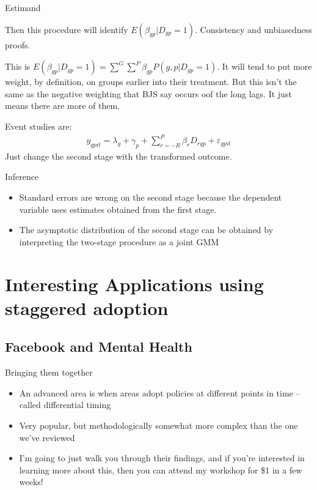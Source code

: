 \documentclass{beamer}
\begin{document}
\begin{frame}{Estimand}

Then this procedure will identify $E(\beta_{gp} | D_{gp}=1)$. Consistency and unbiasedness proofs. 

\bigskip

This is $E(\beta_{gp}|D_{gp}=1) = \sum^G \sum^P \beta_{gp} P(g,p|D_{gp}=1)$. It will tend to put more weight, by definition, on groups earlier into their treatment.  But this isn't the same as the negative weighting that BJS say occurs oof the long lags.  It just means there are more of them.

\bigskip

Event studies are:
\begin{eqnarray*}
y_{gpit} = \lambda_g + \gamma_p + \sum_{r=-R}^P \beta_rD_{rgp} + \varepsilon_{gpit}
\end{eqnarray*}Just change the second stage with the transformed outcome. 

\end{frame}

\begin{frame}{Inference}

\begin{itemize}
\item Standard errors are wrong on the second stage because the dependent variable uses estimates obtained from the first stage. 
\item The asymptotic distribution of the second stage can be obtained by interpreting the two-stage procedure as a joint GMM
\end{itemize}

\end{frame}

\section{Interesting Applications using staggered adoption}

\subsection{Facebook and Mental Health}

\begin{frame}{Bringing them together}

\begin{itemize}

\item An advanced area is when areas adopt policies at different points in time -- called differential timing
\item Very popular, but methodologically somewhat more complex than the one we've reviewed
\item I'm going to just walk you through their findings, and if you're interested in learning more about this, then you can attend my workshop for \$1 in a few weeks!

\end{itemize}

\end{frame}
\end{document}
